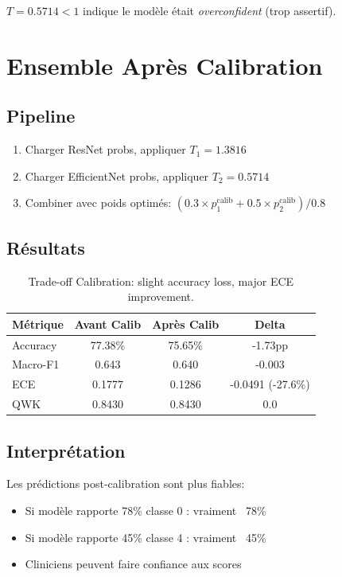 \documentclass[12pt,a4paper,oneside]{report}
\begin{document}
$T = 0.5714 < 1$ indique le modèle était \textit{overconfident} 
(trop assertif).

\section{Ensemble Après Calibration}

\subsection{Pipeline}

\begin{enumerate}
    \item Charger ResNet probs, appliquer $T_1 = 1.3816$
    \item Charger EfficientNet probs, appliquer $T_2 = 0.5714$
    \item Combiner avec poids optimés: $(0.3 \times p_1^{\text{calib}} 
          + 0.5 \times p_2^{\text{calib}}) / 0.8$
\end{enumerate}

\subsection{Résultats}

\begin{table}[H]
\centering
\begin{tabular}{|l|c|c|c|}
\hline
Métrique & Avant Calib & Après Calib & Delta \\
\hline
Accuracy & 77.38\% & 75.65\% & -1.73pp \\
Macro-F1 & 0.643 & 0.640 & -0.003 \\
ECE & 0.1777 & 0.1286 & -0.0491 (-27.6\%) \\
QWK & 0.8430 & 0.8430 & 0.0 \\
\hline
\end{tabular}
\caption{Trade-off Calibration: slight accuracy loss, major ECE 
improvement.}
\label{tab:ensemble_calib_results}
\end{table}

\subsection{Interprétation}

Les prédictions post-calibration sont plus fiables:
\begin{itemize}
    \item Si modèle rapporte 78\% classe 0 : vraiment ~78\%
    \item Si modèle rapporte 45\% classe 4 : vraiment ~45\%
    \item Cliniciens peuvent faire confiance aux scores
\end{itemize}
\end{document}
